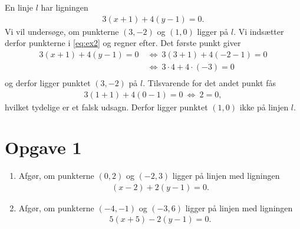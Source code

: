 \begin{exa}
En linje $l$ har ligningen 
\begin{align}\label{eq:ex2}
	3(x+1) + 4(y-1) = 0.
\end{align}
Vi vil undersøge, om punkterne $(3,-2)$ og $(1,0)$ ligger på $l$. Vi indsætter derfor punkterne i \eqref{eq:ex2} og regner efter. Det første punkt giver
\begin{align*}
3(x+1) + 4(y-1) = 0 \ &\Leftrightarrow \  3(3+1) + 4(-2-1) = 0 \\
& \Leftrightarrow \ 3\cdot 4+4\cdot(-3) = 0\\
\end{align*}
og derfor ligger punktet $(3,-2)$ på $l$. Tilsvarende for det andet punkt fås
\begin{align*}
3(1+1) + 4(0-1) = 0 \  \Leftrightarrow \ 2 = 0, 
\end{align*}
hvilket tydelige er et falsk udsagn. Derfor ligger punktet $(1,0)$ ikke på linjen $l$. 
\end{exa}


\section*{Opgave 1}
\begin{enumerate}[label=\roman*)]
\item Afgør, om punkterne $(0,2)$ og $(-2,3)$ ligger på linjen med ligningen
\begin{align*}
	(x-2) + 2(y-1) = 0.
\end{align*}
\item Afgør, om punkterne $(-4,-1)$ og $(-3,6)$ ligger på linjen med ligningen 
\begin{align*}
	5(x+5) - 2(y-1) = 0.
\end{align*}
\end{enumerate}

